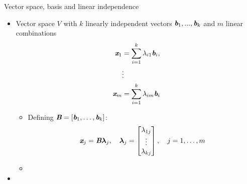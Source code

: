 \documentclass[12pt]{article}
\theoremstyle{definition}
\newcommand{\mat}[1]{\textit{\textbf{#1}}}
\begin{document}
        Vector space, basis and linear independence
        \begin{itemize}
            \item Vector space $V$ with $k$ linearly independent vectors $\mat{b}_1,...,\mat{b}_k$ and $m$ linear combinations
                \begin{align*}
                    \mat{x}_1 &= \sum_{i=1}^{k}\lambda_{i1}\mat{b}_i,\\
                    &\vdots\\
                    \mat{x}_m &= \sum_{i=1}^{k}\lambda_{im}\mat{b}_i
                \end{align*}
                \begin{itemize}
                    \item Defining $\mat{B}=[\mat{b}_1, \dots, \mat{b}_k]$: 
                        \begin{equation*}
                            \mat{x}_j=\mat{B}\bm{\lambda}_j, \quad \bm{\lambda}_j=\left[\begin{matrix}
                                \lambda_{1j}\\
                                \vdots\\
                                \lambda_{kj}
                            \end{matrix}\right], \quad j = 1, \dots, m
                        \end{equation*}
                    \item 
                \end{itemize}
            \item
        \end{itemize}
    \section{}
    \section{}
    \section{}
\end{document}
